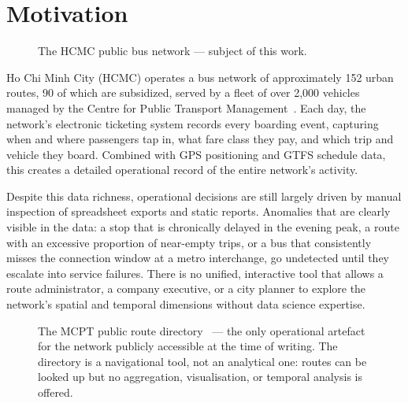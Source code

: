 \section{Motivation}
\label{sec:intro:motivation}

\begin{figure}[H]
\centering
{}
\caption{The HCMC public bus network --- subject of this work.}
\label{fig:intro:bus}
\end{figure}

Ho Chi Minh City (HCMC) operates a bus network of approximately 152 urban
routes, 90 of which are subsidized, served by a fleet of over 2,000 vehicles
managed by the Centre for Public Transport Management~\cite{ttgtcc2024}.
Each day, the network's electronic ticketing system records every boarding
event, capturing when and where passengers tap in, what fare class they
pay, and which trip and vehicle they board. Combined with GPS positioning
and GTFS schedule data, this creates a detailed operational record of the
entire network's activity.
 
Despite this data richness, operational decisions are still largely driven by
manual inspection of spreadsheet exports and static reports. Anomalies that
are clearly visible in the data: a stop that is chronically delayed in the
evening peak, a route with an excessive proportion of near-empty trips, or a
bus that consistently misses the connection window at a metro interchange, go
undetected until they escalate into service failures. There is no unified,
interactive tool that allows a route administrator, a company executive, or a
city planner to explore the network's spatial and temporal dimensions without
data science expertise.

\begin{figure}[H]
\centering
{}
\caption{The MCPT public route directory~\cite{ttgtcc2024} ---
the only operational artefact for the network publicly accessible
at the time of writing. The directory is a navigational tool,
not an analytical one: routes can be looked up but no aggregation,
visualisation, or temporal analysis is offered.}
\label{fig:intro:mcpt}
\end{figure}
 
